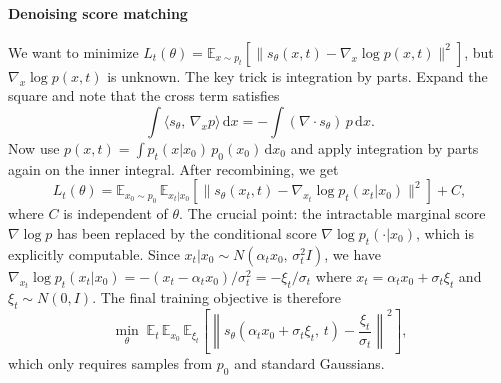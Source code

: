 \begin{exam}
\paragraph{Denoising score matching} We want to minimize $L_t(\theta) = \mathbb{E}_{x \sim p_t}\left[\|s_\theta(x,t) - \nabla_x \log p(x,t)\|^2\right]$, but $\nabla_x \log p(x,t)$ is unknown. The key trick is integration by parts. Expand the square and note that the cross term satisfies
\[
\int \langle s_\theta,\, \nabla_x p\rangle\,\mathrm{d}x = -\int (\nabla \cdot s_\theta)\, p\,\mathrm{d}x.
\]
Now use $p(x,t) = \int p_t(x|x_0)\,p_0(x_0)\,\mathrm{d}x_0$ and apply integration by parts again on the inner integral. After recombining, we get
\[
L_t(\theta) = \mathbb{E}_{x_0 \sim p_0}\,\mathbb{E}_{x_t | x_0}\left[\|s_\theta(x_t, t) - \nabla_{x_t} \log p_t(x_t | x_0)\|^2\right] + C,
\]
where $C$ is independent of $\theta$. The crucial point: the intractable marginal score $\nabla \log p$ has been replaced by the conditional score $\nabla \log p_t(\cdot | x_0)$, which is explicitly computable. Since $x_t | x_0 \sim N(\alpha_t x_0,\, \sigma_t^2 I)$, we have $\nabla_{x_t} \log p_t(x_t|x_0) = -(x_t - \alpha_t x_0)/\sigma_t^2 = -\xi_t/\sigma_t$ where $x_t = \alpha_t x_0 + \sigma_t \xi_t$ and $\xi_t \sim N(0,I)$. The final training objective is therefore
\[
\min_\theta\; \mathbb{E}_t\,\mathbb{E}_{x_0}\,\mathbb{E}_{\xi_t}\left[\left\|s_\theta(\alpha_t x_0 + \sigma_t \xi_t,\, t) - \frac{\xi_t}{\sigma_t}\right\|^2\right],
\]
which only requires samples from $p_0$ and standard Gaussians.
\end{exam}
